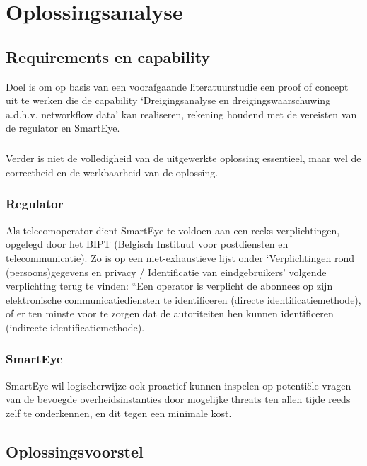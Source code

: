 \chapter{Oplossingsanalyse}

\section{Requirements en capability}


Doel is om op basis van een voorafgaande literatuurstudie een proof of concept uit te werken die de capability ‘Dreigingsanalyse en dreigingswaarschuwing a.d.h.v. networkflow data’ kan realiseren, rekening houdend met de vereisten van de regulator en SmartEye.

\paragraph{}
Verder is niet de volledigheid van de uitgewerkte oplossing essentieel, maar wel de correctheid en de werkbaarheid van de oplossing.

\subsection{Regulator}
Als telecomoperator dient SmartEye te voldoen aan een reeks verplichtingen, opgelegd door het BIPT (Belgisch Instituut voor postdiensten en telecommunicatie). Zo is op een niet-exhaustieve lijst onder ‘Verplichtingen rond (persoons)gegevens en privacy / Identificatie van eindgebruikers’ volgende verplichting terug te vinden: “Een operator is verplicht de abonnees op zijn elektronische communicatiediensten te identificeren (directe identificatiemethode), of er ten minste voor te zorgen dat de autoriteiten hen kunnen identificeren (indirecte identificatiemethode).

\subsection{SmartEye}
SmartEye wil logischerwijze ook proactief kunnen inspelen op potentiële vragen van de bevoegde overheidsinstanties door mogelijke threats ten allen tijde reeds zelf te onderkennen, en dit tegen een minimale kost.

\section{Oplossingsvoorstel}


